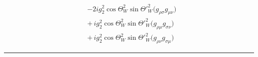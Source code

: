 \begin{align} 
 &-2 i g_{2}^{2} \cos\Theta_{W }^{2} \sin{\Theta'}_{W }^{2} \Big(g_{\rho \sigma} g_{\mu \nu} \Big)\\ 
  & + \,i g_{2}^{2} \cos\Theta_{W }^{2} \sin{\Theta'}_{W }^{2} \Big(g_{\rho \mu} g_{\sigma \nu} \Big)\\ 
  & + \,i g_{2}^{2} \cos\Theta_{W }^{2} \sin{\Theta'}_{W }^{2} \Big(g_{\rho \nu} g_{\sigma \mu} \Big)\end{align} 
\hrule 
